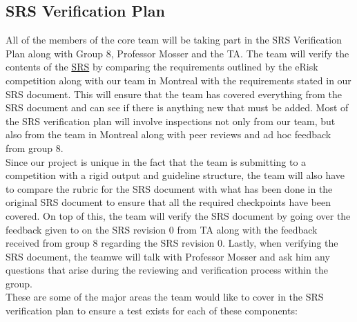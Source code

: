 \documentclass[12pt, titlepage]{article}
\begin{document}
  
  \subsection{SRS Verification Plan} \label{SRS Verification Plan}
  
  All of the members of the core team will be taking part in the SRS Verification Plan along with Group 8, Professor Mosser and the TA. The team will verify the contents of the \href{https://github.com/MichaelBreau/nlp-mentalhealth/blob/main/docs/SRS/index.pdf}{SRS} by comparing the requirements outlined by the eRisk competition along with our team in Montreal with the requirements stated in our SRS document. This will ensure that the team has covered everything from the SRS document and can see if there is anything new that must be added. Most of the SRS verification plan will involve inspections not only from our team, but also from the team in Montreal along with peer reviews and ad hoc feedback from group 8.\\
  
  Since our project is unique in the fact that the team is submitting to a competition with a rigid output and guideline structure, the team will also have to compare the rubric for the SRS document with what has been done in the original SRS document to ensure that all the required checkpoints have been covered. On top of this, the team will verify the SRS document by going over the feedback given to on the SRS revision 0 from TA along with the feedback received from group 8 regarding the SRS revision 0. Lastly, when verifying the SRS document, the teamwe will talk with Professor Mosser and ask him any questions that arise during the reviewing and verification process within the group. \\

  These are some of the major areas the team would like to cover in the SRS verification plan to ensure a test exists for each of these components:\\
\end{document}
